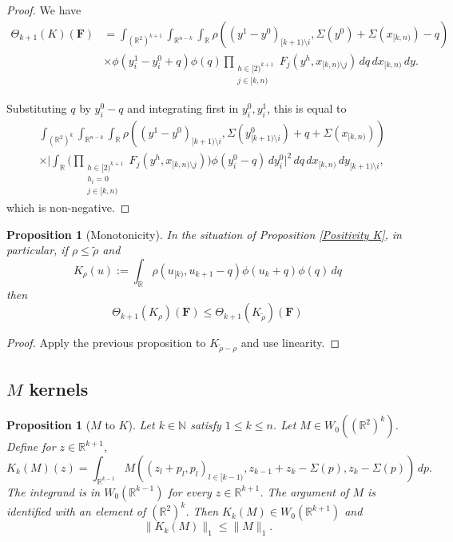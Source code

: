 \documentclass[12pt,reqno]{amsart}
\theoremstyle{plain}
\newtheorem{proposition}[theorem]{Proposition}
\numberwithin{equation}{section}
\theoremstyle{remark}
\newcommand{\using}[1]{}
\newcommand{\R}{{\mathbb R}}
\newcommand{\N}{{\mathbb N}}
\newcommand{\F}{\mathbf{F}}
\begin{document}
\begin{proof}
We have
\[
\begin{aligned}
 \Theta_{k+1}(K)(\F)
&= \int_{(\R^2)^{k+1}}\int_{\R^{n-k}}\int_\R
\rho((y^1-y^0)_{[k+1)\setminus i},\Sigma(y^0)+\Sigma(x_{[k,n)})-q)
\\
&\times
\phi(y_i^1-y_i^0+q)\phi(q)
\prod_{\substack{h\in [2)^{k+1}\\j\in[k,n)}}
F_j(y^h,x_{[k,n)\setminus j})
\,dq\,dx_{[k,n)}\,dy .
\end{aligned}
\]

Substituting \(q\) by \(y_i^0-q\) and integrating first in \(y_i^0,y_i^1\), this is equal to
\[
\begin{aligned}
&\int_{(\R^2)^{k}}\int_{\R^{n-k}}\int_\R
\rho((y^1-y^0)_{[k+1)\setminus i},
\Sigma(y^0_{[k+1)\setminus i})+q+\Sigma(x_{[k,n)}))
\\
&\times
\Big|
\int_\R
\Big(
\prod_{\substack{h\in [2)^{k+1}\\ h_i=0\\ j\in[k,n)}}
F_j(y^h,x_{[k,n)\setminus j})
\Big)
\phi(y_i^0-q)\,dy_i^0
\Big|^2
\,dq\,dx_{[k,n)}\,dy_{[k+1)\setminus i},
\end{aligned}
\]
which is non-negative.
\end{proof}


\begin{proposition}[Monotonicity]\label{Monotonicity K}In the situation of Proposition \ref{Positivity K},
in particular, if $\rho\le \tilde{\rho}$ and
\begin{equation}\label{auto:kernel-monotonicity-K-rho} K_\rho(u):=\int_\R \rho(u_{[k)}, u_{k+1}-q) \phi(u_{k}+q) \phi(q) \, dq\end{equation}
then
\begin{equation}\label{auto:kernel-monotonicity-bound} \Theta_{k+1}(K_\rho)(\F) \le \Theta_{k+1}(K_{\tilde{\rho}})(\F) \end{equation}
\end{proposition}
\begin{proof}
    Apply the previous proposition to $K_{\tilde{\rho}-\rho}$ and use linearity.
\end{proof}

\subsection{\texorpdfstring{$M$}{M} kernels}

\begin{proposition}[$M$ to $K$]\label{M to K}\using{W_0 Brascamp Lieb}
Let $k\in\N$ satisfy $1\le k\le n$. Let $M\in W_0((\R^2)^k)$.
Define for $z\in \R^{k+1}$,
\begin{equation}\label{kviam_2}
    K_k(M)(z)=\int_{\R^{k-1}}  M((z_{l}+p_{l},p_{l})_{l\in [k-1)}, z_{k-1}+z_{k}-\Sigma(p),z_{k}-\Sigma(p))\,dp.
\end{equation}
The integrand is in $W_0(\R^{k-1})$ for every $z\in\R^{k+1}$.
The argument of $M$ is identified with an element of $(\R^2)^{k}$.
Then $K_k(M)\in W_0(\R^{k+1})$ and
\begin{equation}\label{auto:K-map-L1-bound} \|K_k(M)\|_1 \le \|M\|_1. \end{equation}
\end{proposition}
\end{document}

